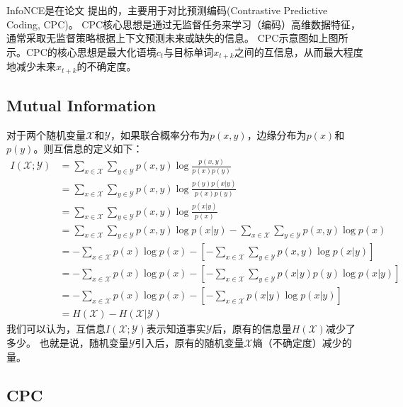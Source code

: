 \documentclass{article}
\begin{document}
InfoNCE是在论文 \cite{DBLP:journals/corr/abs-1807-03748} 提出的，主要用于对比预测编码(Contrastive Predictive Coding, CPC)。 
CPC核心思想是通过无监督任务来学习（编码）高维数据特征，通常采取无监督策略根据上下文预测未来或缺失的信息。
CPC示意图如上图所示。CPC的核心思想是最大化语境$c_t$与目标单词$x_{t+k}$之间的互信息，从而最大程度地减少未来$x_{t+k}$的不确定度。

\subsection{Mutual Information}

对于两个随机变量$\mathcal{X}$和$\mathcal{Y}$，如果联合概率分布为$p(x,y)$，边缘分布为$p(x)$和$p(y)$。则互信息的定义如下：
\begin{equation}
    \begin{split}
        I(\mathcal{X};\mathcal{Y}) &= \sum_{x\in\mathcal{X}} \sum_{y\in\mathcal{Y}} p(x,y)\log \frac{p(x,y)}{p(x)p(y)} \\
        &= \sum_{x\in\mathcal{X}} \sum_{y\in\mathcal{Y}} p(x,y)\log \frac{p(y)p(x|y)}{p(x)p(y)}\\
        &= \sum_{x\in\mathcal{X}} \sum_{y\in\mathcal{Y}} p(x,y)\log \frac{p(x|y)}{p(x)}\\
        &= \sum_{x\in\mathcal{X}} \sum_{y\in\mathcal{Y}} p(x,y)\log p(x|y) - \sum_{x\in\mathcal{X}} \sum_{y\in\mathcal{Y}} p(x,y)\log p(x)\\
        &= -\sum_{x\in\mathcal{X}} p(x)\log p(x) - \left[ -\sum_{x\in\mathcal{X}} \sum_{y\in\mathcal{Y}} p(x,y)\log p(x|y) \right] \\
        &= -\sum_{x\in\mathcal{X}} p(x)\log p(x) - \left[ -\sum_{x\in\mathcal{X}} \sum_{y\in\mathcal{Y}} p(x|y)p(y) \log p(x|y) \right]\\
        &= -\sum_{x\in\mathcal{X}} p(x)\log p(x) - \left[ -\sum_{x\in\mathcal{X}} p(x|y) \log p(x|y) \right]\\
        &= H(\mathcal{X}) - H(\mathcal{X}|\mathcal{Y})
    \end{split}
\end{equation}
我们可以认为，互信息$I(\mathcal{X};\mathcal{Y})$表示知道事实$\mathcal{Y}$后，原有的信息量$H(\mathcal{X})$减少了多少。
也就是说，随机变量$\mathcal{Y}$引入后，原有的随机变量$\mathcal{X}$熵（不确定度）减少的量。

\subsection{CPC}
\end{document}
